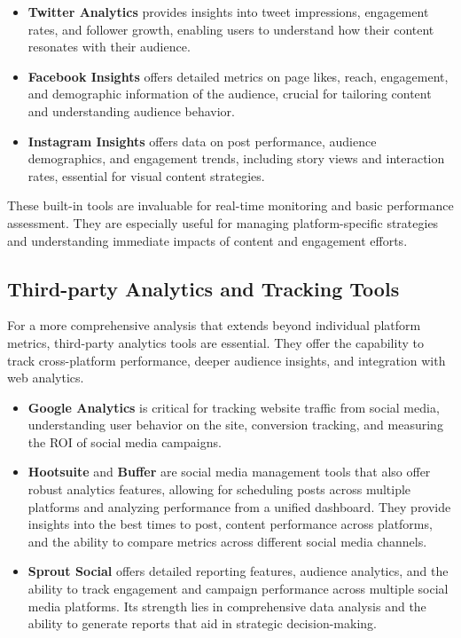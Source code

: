 \documentclass[
]{book}
\providecommand{\tightlist}{%
  \setlength{\itemsep}{0pt}\setlength{\parskip}{0pt}}
\begin{document}
\begin{itemize}
\tightlist
\item
  \textbf{Twitter Analytics} provides insights into tweet impressions, engagement rates, and follower growth, enabling users to understand how their content resonates with their audience.
\item
  \textbf{Facebook Insights} offers detailed metrics on page likes, reach, engagement, and demographic information of the audience, crucial for tailoring content and understanding audience behavior.
\item
  \textbf{Instagram Insights} offers data on post performance, audience demographics, and engagement trends, including story views and interaction rates, essential for visual content strategies.
\end{itemize}

These built-in tools are invaluable for real-time monitoring and basic performance assessment. They are especially useful for managing platform-specific strategies and understanding immediate impacts of content and engagement efforts.

\hypertarget{third-party-analytics-and-tracking-tools}{%
\subsection*{Third-party Analytics and Tracking Tools}\label{third-party-analytics-and-tracking-tools}}

For a more comprehensive analysis that extends beyond individual platform metrics, third-party analytics tools are essential. They offer the capability to track cross-platform performance, deeper audience insights, and integration with web analytics.

\begin{itemize}
\tightlist
\item
  \textbf{Google Analytics} is critical for tracking website traffic from social media, understanding user behavior on the site, conversion tracking, and measuring the ROI of social media campaigns.
\item
  \textbf{Hootsuite} and \textbf{Buffer} are social media management tools that also offer robust analytics features, allowing for scheduling posts across multiple platforms and analyzing performance from a unified dashboard. They provide insights into the best times to post, content performance across platforms, and the ability to compare metrics across different social media channels.
\item
  \textbf{Sprout Social} offers detailed reporting features, audience analytics, and the ability to track engagement and campaign performance across multiple social media platforms. Its strength lies in comprehensive data analysis and the ability to generate reports that aid in strategic decision-making.
\end{itemize}
\end{document}
